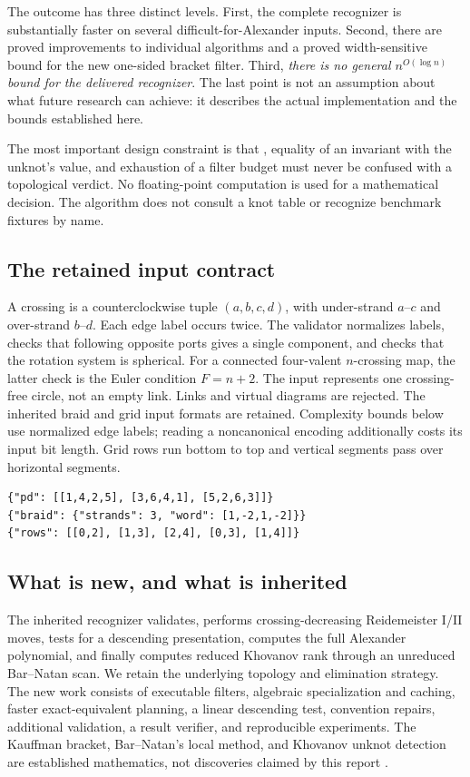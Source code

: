 \documentclass[11pt]{article}
\theoremstyle{remark}\newtheorem{remark}[theorem]{Remark}
\newcommand{\code}[1]{\texttt{\detokenize{#1}}}
\begin{document}
The outcome has three distinct levels. First, the complete recognizer is
substantially faster on several difficult-for-Alexander inputs. Second, there
are proved improvements to individual algorithms and a proved width-sensitive
bound for the new one-sided bracket filter. Third, \emph{there is no general
$n^{O(\log n)}$ bound for the delivered recognizer}. The last point is not an
assumption about what future research can achieve: it describes the actual
implementation and the bounds established here.

The most important design constraint is that \code{UNKNOWN}, equality of an
invariant with the unknot's value, and exhaustion of a filter budget must never
be confused with a topological verdict. No floating-point computation is used
for a mathematical decision. The algorithm does not consult a knot table or
recognize benchmark fixtures by name.

\subsection{The retained input contract}
A crossing is a counterclockwise tuple $(a,b,c,d)$, with under-strand $a$--$c$
and over-strand $b$--$d$. Each edge label occurs twice. The validator normalizes
labels, checks that following opposite ports gives a single component, and
checks that the rotation system is spherical. For a connected four-valent
$n$-crossing map, the latter check is the Euler condition $F=n+2$.
The input \code{{"pd": []}} represents one crossing-free circle, not an
empty link. Links and virtual diagrams are rejected. The inherited braid and
grid input formats are retained. Complexity bounds below use normalized edge
labels; reading a noncanonical encoding additionally costs its input bit length. Grid rows run bottom to top and vertical
segments pass over horizontal segments.

\begin{lstlisting}
{"pd": [[1,4,2,5], [3,6,4,1], [5,2,6,3]]}
{"braid": {"strands": 3, "word": [1,-2,1,-2]}}
{"rows": [[0,2], [1,3], [2,4], [0,3], [1,4]]}
\end{lstlisting}

\subsection{What is new, and what is inherited}
The inherited recognizer validates, performs crossing-decreasing Reidemeister
I/II moves, tests for a descending presentation, computes the full Alexander
polynomial, and finally computes reduced Khovanov rank through an unreduced
Bar--Natan scan. We retain the underlying topology and elimination strategy.
The new work consists of executable filters, algebraic specialization and
caching, faster exact-equivalent planning, a linear descending test, convention
repairs, additional validation, a result verifier, and reproducible experiments.
The Kauffman bracket, Bar--Natan's local method, and Khovanov unknot detection
are established mathematics, not discoveries claimed by this report
\cite{Kauffman,BN,KM}.
\end{document}
